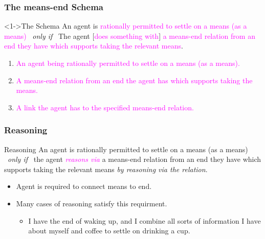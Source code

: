 \documentclass[noamssymb, compress, handout]{beamer} %
\begin{document}
\begin{frame}
  \frametitle{The means-end Schema}

  \begin{block}<1->{The Schema}
    An agent is \textcolor<3>{fuchsia}{rationally permitted to settle on a means (as a means)}
    \newline
    \mbox{ }\hfill\emph{only if}\hfill\mbox{ }
    \newline
    The agent [\textcolor<5>{fuchsia}{does something with}] \textcolor<4>{fuchsia}{a means-end relation from an end they have which supports taking the relevant means}.
  \end{block}

  \begin{enumerate}%
  \item<3-5> \textcolor<3>{fuchsia}{An agent being rationally permitted to settle on a means (as a means).}
  \item<4-5> \textcolor<4>{fuchsia}{A means-end relation from an end the agent has which supports taking the means.}
  \item<5-5> \textcolor<5>{fuchsia}{A link the agent has to the specified means-end relation.}
  \end{enumerate}
\end{frame}

\begin{frame}
  \frametitle{Reasoning}

  \begin{block}{Reasoning}
    An agent is rationally permitted to settle on a means (as a means)
    \newline
    \mbox{ }\hfill\emph{only if}\hfill\mbox{ }
    \newline
    the agent \textcolor{fuchsia}{\emph{reasons via}} a means-end relation from an end they have which supports taking the relevant means \emph{by reasoning via the relation}.
  \end{block}

  \begin{itemize}
  \item Agent is required to connect means to end.
  \item Many cases of reasoning satisfy this requirment.
    \begin{itemize}
    \item I have the end of waking up, and I combine all sorts of information I have about myself and coffee to settle on drinking a cup.
    \end{itemize}
  \end{itemize}
\end{frame}
\end{document}
